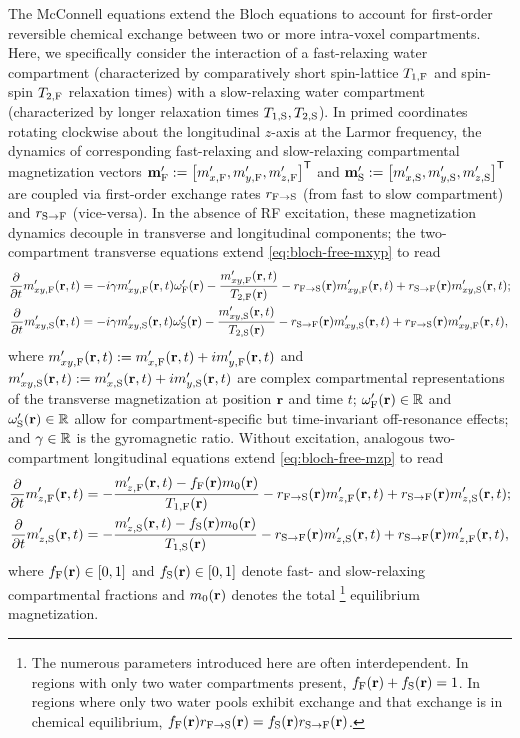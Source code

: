 The McConnell equations \cite{mcconnell:58:rrb}
extend the Bloch equations \cite{bloch:1946:ni-paper}
to account for first-order reversible chemical exchange
between two or more intra-voxel compartments. 
Here,
we specifically consider the interaction
of a fast-relaxing water compartment
(characterized by comparatively short spin-lattice $T_{1,\mathrm{F}}$ 
and spin-spin $T_{2,\mathrm{F}}$ relaxation times) 
with a slow-relaxing water compartment
(characterized by longer relaxation times $T_{1,\mathrm{S}},T_{2,\mathrm{S}}$).
In primed coordinates rotating clockwise 
about the longitudinal $z$-axis
at the Larmor frequency,
the dynamics 
of corresponding fast-relaxing and slow-relaxing
compartmental magnetization vectors
$\bmmpf := \brac{\mxpf, \mypf, \mzpf}\tpose$
and
$\bmmps := \brac{\mxps, \myps, \mzps}\tpose$
are coupled via first-order exchange rates 
$r_{\mathrm{F}\to\mathrm{S}}$ (from fast to slow compartment) 
and $r_{\mathrm{S}\to\mathrm{F}}$ (vice-versa).
In the absence of RF excitation,
these magnetization dynamics
decouple in transverse and longitudinal components;
the two-compartment transverse equations 
extend \eqref{eq:bloch-free-mxyp} to read
\begin{align}
	\dela{t} \mxypf\prt &= 
		-i\gam \mxypf\prt \ompf\pr - \frac{\mxypf\prt}{\tf{2}\pr} 
		- \rfs\pr \mxypf\prt + \rsf\pr \mxyps\prt;
		\label{eq:mwf,mxy-f} \\
	\dela{t} \mxyps\prt &= 
		-i\gam \mxyps\prt \omps\pr - \frac{\mxyps\prt}{\ts{2}\pr} 
		- \rsf\pr \mxyps\prt + \rfs\pr \mxypf\prt,
		\label{eq:mwf,mxy-s}
\end{align}
where 
$\mxypf\prt := \mxpf\prt + i\mypf\prt$ 
and $\mxyps\prt := \mxps\prt + i\myps\prt$
are complex compartmental representations
of the transverse magnetization
at position $\mathbf{r}$ 
and time $t$; 
$\ompf\pr \in \real$ and $\omps\pr \in \real$ 
allow for compartment-specific 
but time-invariant off-resonance effects;
and $\gamma \in \mathbb{R}$ is the gyromagnetic ratio.
Without excitation,
analogous two-compartment longitudinal equations 
extend \eqref{eq:bloch-free-mzp} to read
\begin{align}
	\dela{t} \mzpf\prt &=
		-\frac{\mzpf\prt - \ff\pr\mzero\pr}{\tf{1}\pr} 
		- \rfs\pr \mzpf\prt + \rsf\pr \mzps\prt;
		\label{eq:mwf,mz-f} \\
	\dela{t} \mzps\prt &= 
		-\frac{\mzps\prt - \fs\pr\mzero\pr}{\ts{1}\pr}
		- \rsf\pr \mzps\prt + \rsf\pr \mzpf\prt,
		\label{eq:mwf,mz-s}
\end{align}
where $\ff\pr \in \brac{0,1}$ and $\fs\pr \in \brac{0,1}$ 
denote fast- and slow-relaxing
compartmental fractions
and $\mzero\pr$ denotes the total 
\footnote{The numerous parameters introduced here
	are often interdependent. 
	In regions with only two water compartments present,
	$\ff\pr + \fs\pr = 1$.
	In regions where only two water pools exhibit exchange 
	and that exchange is in chemical equilibrium,
	$\ff\pr \rfs\pr = \fs\pr \rsf\pr$.
}
equilibrium magnetization.
 

